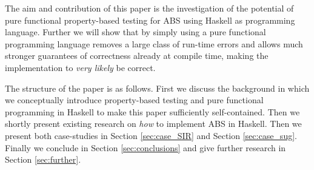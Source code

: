 The aim and contribution of this paper is the investigation of the potential of pure functional property-based testing for ABS using Haskell as programming language. Further we will show that by simply using a pure functional programming language removes a large class of run-time errors and allows much stronger guarantees of correctness already at compile time, making the implementation to \textit{very likely} be correct.

The structure of the paper is as follows. First we discuss the background in which we conceptually introduce property-based testing and pure functional programming in Haskell to make this paper sufficiently self-contained. Then we shortly present existing research on \textit{how} to implement ABS in Haskell. Then we present both case-studies in Section \ref{sec:case_SIR} and Section \ref{sec:case_sug}. Finally we conclude in Section \ref{sec:conclusions} and give further research in Section \ref{sec:further}. 